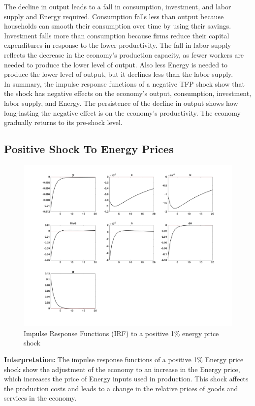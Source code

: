 \documentclass[a4paper,11pt]{article}
\begin{document}
The decline in output leads to a fall in consumption, investment, and labor supply and Energy required. Consumption falls less than output because households can smooth their consumption over time by using their savings. Investment falls more than consumption because firms reduce their capital expenditures in response to the lower productivity. The fall in labor supply reflects the decrease in the economy's production capacity, as fewer workers are needed to produce the lower level of output. Also less Energy is needed to produce the lower level of output, but it declines less than the labor supply.\\

In summary, the impulse response functions of a negative TFP shock show that the shock has negative effects on the economy's output, consumption, investment, labor supply, and Energy. The persistence of the decline in output shows how long-lasting the negative effect is on the economy's productivity. The economy gradually returns to its pre-shock level.


\subsection{Positive Shock To Energy Prices}
\begin{figure}[H]
    \centering
    \includegraphics[scale=0.4]{IRF_EnergyShock.png}
    \caption{Impulse Response Functions (IRF) to a positive 1\% energy price shock }
    \label{fig:my_label}
\end{figure}
\pagebreak

\textbf{Interpretation:} 
The impulse response functions of a positive 1\% Energy price shock show the adjustment of the economy to an increase in the Energy price, which increases the price of Energy inputs used in production. This shock affects the production costs and leads to a change in the relative prices of goods and services in the economy.\\
\end{document}
